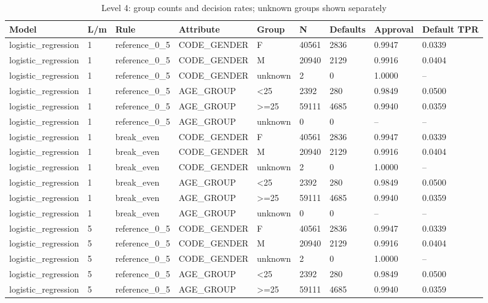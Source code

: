 \begin{longtable}{lllllllll}
\caption{Level 4: group counts and decision rates; unknown groups shown separately}\\
\toprule
Model & L/m & Rule & Attribute & Group & N & Defaults & Approval & Default TPR \\
\midrule
\endhead
logistic\_regression & 1 & reference\_0\_5 & CODE\_GENDER & F & 40561 & 2836 & 0.9947 & 0.0339 \\
logistic\_regression & 1 & reference\_0\_5 & CODE\_GENDER & M & 20940 & 2129 & 0.9916 & 0.0404 \\
logistic\_regression & 1 & reference\_0\_5 & CODE\_GENDER & unknown & 2 & 0 & 1.0000 & -- \\
logistic\_regression & 1 & reference\_0\_5 & AGE\_GROUP & <25 & 2392 & 280 & 0.9849 & 0.0500 \\
logistic\_regression & 1 & reference\_0\_5 & AGE\_GROUP & >=25 & 59111 & 4685 & 0.9940 & 0.0359 \\
logistic\_regression & 1 & reference\_0\_5 & AGE\_GROUP & unknown & 0 & 0 & -- & -- \\
logistic\_regression & 1 & break\_even & CODE\_GENDER & F & 40561 & 2836 & 0.9947 & 0.0339 \\
logistic\_regression & 1 & break\_even & CODE\_GENDER & M & 20940 & 2129 & 0.9916 & 0.0404 \\
logistic\_regression & 1 & break\_even & CODE\_GENDER & unknown & 2 & 0 & 1.0000 & -- \\
logistic\_regression & 1 & break\_even & AGE\_GROUP & <25 & 2392 & 280 & 0.9849 & 0.0500 \\
logistic\_regression & 1 & break\_even & AGE\_GROUP & >=25 & 59111 & 4685 & 0.9940 & 0.0359 \\
logistic\_regression & 1 & break\_even & AGE\_GROUP & unknown & 0 & 0 & -- & -- \\
logistic\_regression & 5 & reference\_0\_5 & CODE\_GENDER & F & 40561 & 2836 & 0.9947 & 0.0339 \\
logistic\_regression & 5 & reference\_0\_5 & CODE\_GENDER & M & 20940 & 2129 & 0.9916 & 0.0404 \\
logistic\_regression & 5 & reference\_0\_5 & CODE\_GENDER & unknown & 2 & 0 & 1.0000 & -- \\
logistic\_regression & 5 & reference\_0\_5 & AGE\_GROUP & <25 & 2392 & 280 & 0.9849 & 0.0500 \\
logistic\_regression & 5 & reference\_0\_5 & AGE\_GROUP & >=25 & 59111 & 4685 & 0.9940 & 0.0359 \\

\end{longtable}

